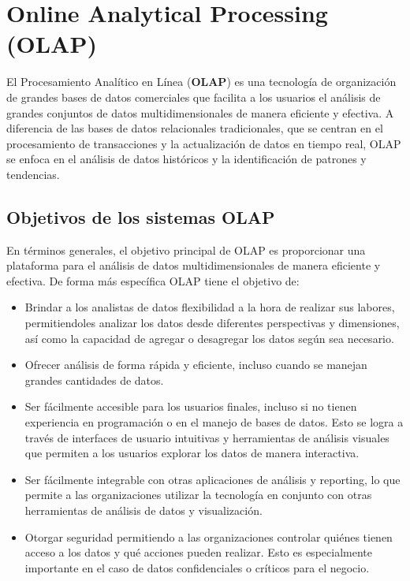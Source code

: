 \section{Online Analytical Processing (OLAP)} \label{section:olap}

El Procesamiento Anal\'itico en L\'inea (\textbf{OLAP}) es una tecnología de organización de grandes bases de datos 
comerciales que facilita a los usuarios el an\'alisis de grandes conjuntos de datos multidimensionales de manera 
eficiente y efectiva. A diferencia de las bases de datos relacionales tradicionales, que se centran en el procesamiento 
de transacciones y la actualización de datos en tiempo real, OLAP se enfoca en el análisis de datos históricos y la 
identificación de patrones y tendencias. 

\subsection{Objetivos de los sistemas OLAP}

En términos generales, el objetivo principal de OLAP es proporcionar una plataforma para el análisis de datos 
multidimensionales de manera eficiente y efectiva. De forma m\'as espec\'ifica OLAP tiene el objetivo de: 

\begin{itemize}
    \item Brindar a los analistas de datos flexibilidad a la hora de realizar sus labores, permitiendoles analizar los datos desde 
        diferentes perspectivas y dimensiones, así como la capacidad de agregar o desagregar los datos según sea necesario.
    \item Ofrecer an\'alisis de forma r\'apida y eficiente, incluso cuando se manejan grandes cantidades de datos.
    \item Ser fácilmente accesible para los usuarios finales, incluso si no tienen experiencia en programación o en el 
        manejo de bases de datos. Esto se logra a través de interfaces de usuario intuitivas y herramientas de análisis 
        visuales que permiten a los usuarios explorar los datos de manera interactiva.
    \item Ser f\'acilmente integrable con otras aplicaciones de análisis y reporting, lo que permite a las organizaciones 
        utilizar la tecnología en conjunto con otras herramientas de análisis de datos y visualización.
    \item Otorgar seguridad permitiendo a las organizaciones controlar quiénes tienen acceso a los datos y qué acciones 
        pueden realizar. Esto es especialmente importante en el caso de datos confidenciales o críticos para el negocio.
\end{itemize}

